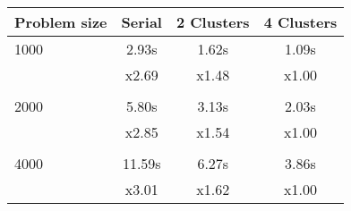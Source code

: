 \centering\begin{tabular}{l*{3}{c}}
\toprule
Problem size & Serial & 2 Clusters & 4 Clusters\\\midrule
1000 &   2.93s &   1.62s &   1.09s \\    
 &  x2.69 &  x1.48 &  x1.00 \\ \\
2000 &   5.80s &   3.13s &   2.03s \\    
 &  x2.85 &  x1.54 &  x1.00 \\ \\
4000 &  11.59s &   6.27s &   3.86s \\    
 &  x3.01 &  x1.62 &  x1.00 \\
\bottomrule
\end{tabular}
